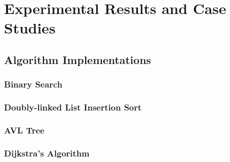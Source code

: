 \documentclass[conference]{IEEEtran}
\begin{document}

\section{Experimental Results and Case Studies}

\subsection{Algorithm Implementations}

\subsubsection{Binary Search}

\subsubsection{Doubly-linked List Insertion Sort}

\subsubsection{AVL Tree}

\subsubsection{Dijkstra's Algorithm}
\end{document}
